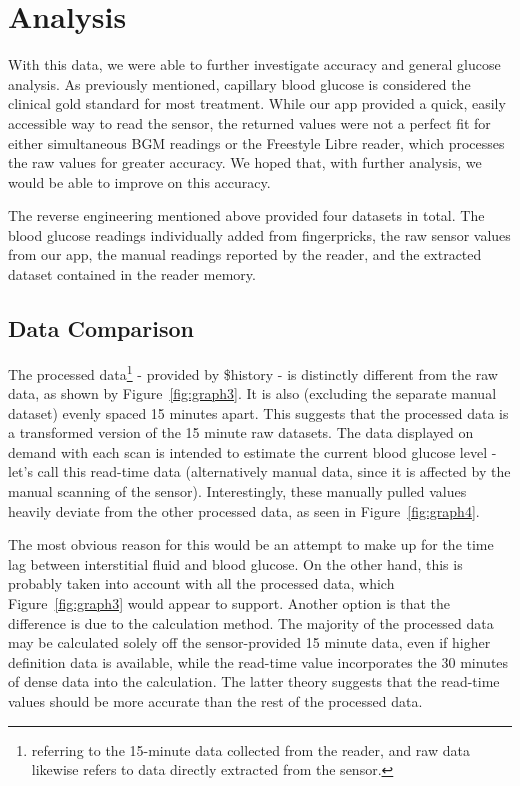 \chapter{Analysis}


With this data, we were able to further investigate accuracy and general glucose analysis. As previously mentioned, capillary blood glucose is considered the clinical gold standard for most treatment. While our app provided a quick, easily accessible way to read the sensor, the returned values were not a perfect fit for either simultaneous BGM readings or the Freestyle Libre reader, which processes the raw values for greater accuracy. We hoped that, with further analysis, we would be able to improve on this accuracy. 

The reverse engineering mentioned above provided four datasets in total. The blood glucose readings individually added from fingerpricks, the raw sensor values from our app, the manual readings reported by the reader, and the extracted dataset contained in the reader memory.

\section{Data Comparison}
The processed data\footnote{referring to the 15-minute data collected from the reader, and raw data likewise refers to data directly extracted from the sensor.} - provided by \$history - is distinctly different from the raw data, as shown by Figure~\ref{fig:graph3}. It is also (excluding the separate manual dataset) evenly spaced 15 minutes apart. This suggests that the processed data is a transformed version of the 15 minute raw datasets. The data displayed on demand with each scan is intended to estimate the current blood glucose level - let's call this read-time data (alternatively manual data, since it is affected by the manual scanning of the sensor). Interestingly, these manually pulled values heavily deviate from the other processed data, as seen in Figure~\ref{fig:graph4}. 

The most obvious reason for this would be an attempt to make up for the time lag between interstitial fluid and blood glucose. On the other hand, this is probably taken into account with all the processed data, which Figure~\ref{fig:graph3} would appear to support. Another option is that the difference is due to the calculation method. The majority of the processed data may be calculated solely off the sensor-provided 15 minute data, even if higher definition data is available, while the read-time value incorporates the 30 minutes of dense data into the calculation. The latter theory suggests that the read-time values should be more accurate than the rest of the processed data.

